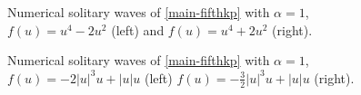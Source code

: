 \documentclass[10pt]{article}
\numberwithin{equation}{section}
\newcommand{\al}{\alpha}
\begin{document}
	
	\begin{figure}[ht]
		\begin{center}
			\caption{Numerical solitary waves of  \eqref{main-fifthkp} with $\al=1$, $f(u)=u^4-2u^2$ (left) and $f(u)=u^4+2u^2$ (right). } \label{nume-slt-2}
	\end{center}\end{figure}
	
		\begin{figure}[ht]
		\begin{center}
			  				\caption{Numerical solitary waves of  \eqref{main-fifthkp} with $\al=1$, $f(u)=-2|u|^3u+|u|u$ (left) $f(u)=-\frac32|u|^3u+|u|u$ (right). } \label{nume-slt-212}
	\end{center}\end{figure}
	
\end{document}
